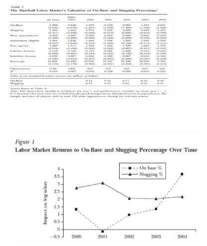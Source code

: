 \documentclass[dvipdfmx,12pt]{beamer}
\begin{document}
\begin{frame}

\begin{center}

\includegraphics[width=9cm,height=7.75cm]{Hakes_Sauer_T3.pdf}

\end{center}

\end{frame}

\begin{frame}

\begin{center}

\includegraphics[width=11cm,height=5.75cm]{Hakes_Sauer_F1.pdf}

\end{center}

\end{frame}
\end{document}
